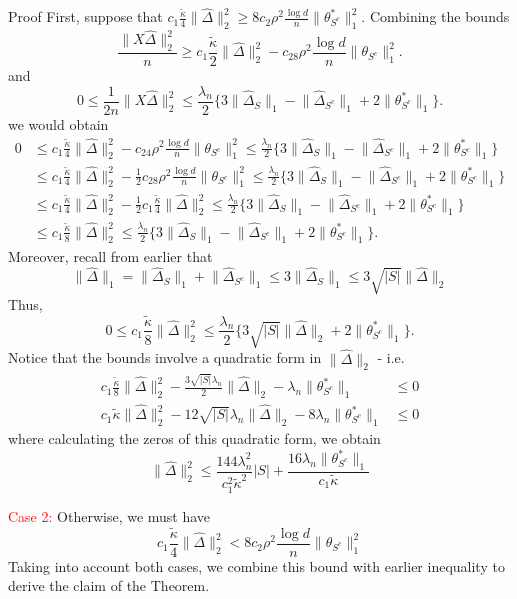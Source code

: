 \documentclass[10pt,handout,english]{beamer}
\begin{document}
\begin{frame}[allowframebreaks]{Proof}
First, suppose that $c_1\frac{\tilde{\kappa}}{4}\lVert\hat{\Delta}\rVert_2^2\geq 8c_2\rho^2\frac{\log d}{n}\lVert\theta_{S^c}^*\rVert_1^2$. Combining the bounds
\[
\frac{\lVert X\hat{\Delta}\rVert_2^2}{n}\geq c_1\frac{\tilde{\kappa}}{2}\lVert\hat{\Delta}\rVert_2^2-c_28\rho^2\frac{\log d}{n}\lVert\theta_{S^c}\rVert_1^2.
\]
and
\[
0\leq\frac{1}{2n}\lVert X\hat{\Delta}\rVert_2^2\leq \frac{\lambda_n}{2} \{3\lVert\hat{\Delta}_S\rVert_1-\lVert\hat{\Delta}_{S^c}\rVert_1+2\lVert\theta_{S^c}^*\rVert_1\}.
\]
we would obtain 
\begingroup
\allowdisplaybreaks
\begin{align*}
0&\leq c_1\frac{\tilde{\kappa}}{4}\lVert\hat{\Delta}\rVert_2^2-c_24\rho^2\frac{\log d}{n}\lVert\theta_{S^c}\rVert_1^2\leq \frac{\lambda_n}{2} \{3\lVert\hat{\Delta}_S\rVert_1-\lVert\hat{\Delta}_{S^c}\rVert_1+2\lVert\theta_{S^c}^*\rVert_1\}\\
&\leq c_1\frac{\tilde{\kappa}}{4}\lVert\hat{\Delta}\rVert_2^2-\frac{1}{2}c_28\rho^2\frac{\log d}{n}\lVert\theta_{S^c}\rVert_1^2\leq \frac{\lambda_n}{2} \{3\lVert\hat{\Delta}_S\rVert_1-\lVert\hat{\Delta}_{S^c}\rVert_1+2\lVert\theta_{S^c}^*\rVert_1\}\\
&\leq c_1\frac{\tilde{\kappa}}{4}\lVert\hat{\Delta}\rVert_2^2-\frac{1}{2}c_1\frac{\tilde{\kappa}}{4}\lVert\hat{\Delta}\rVert_2^2\leq \frac{\lambda_n}{2} \{3\lVert\hat{\Delta}_S\rVert_1-\lVert\hat{\Delta}_{S^c}\rVert_1+2\lVert\theta_{S^c}^*\rVert_1\}\\
&\leq c_1\frac{\tilde{\kappa}}{8}\lVert\hat{\Delta}\rVert_2^2\leq\frac{\lambda_n}{2} \{3\lVert\hat{\Delta}_S\rVert_1-\lVert\hat{\Delta}_{S^c}\rVert_1+2\lVert\theta_{S^c}^*\rVert_1\}. 
\end{align*}
\endgroup
Moreover, recall from earlier that
\[
\lVert\hat{\Delta}\rVert_1=\lVert\hat{\Delta}_{S}\rVert_1+\lVert\hat{\Delta}_{S^c}\rVert_1\leq 3\lVert\hat{\Delta}_S\rVert_1\leq 3\sqrt{\lvert S\rvert}\lVert \hat{\Delta}\rVert_2
\]
Thus, 
\[
0\leq c_1\frac{\tilde{\kappa}}{8}\lVert\hat{\Delta}\rVert_2^2\leq\frac{\lambda_n}{2} \{3\sqrt{\lvert S\rvert}\lVert\hat{\Delta}\rVert_2+2\lVert\theta_{S^c}^*\rVert_1\}.
\]
Notice that the bounds involve a quadratic form in $\lVert\hat{\Delta}\rVert_2$ - i.e.
\begin{align*}
c_1\frac{\tilde{\kappa}}{8}\lVert\hat{\Delta}\rVert_2^2-\frac{3\sqrt{\lvert S\rvert}\lambda_n}{2}\lVert\hat{\Delta}\rVert_2-\lambda_n\lVert\theta_{S^c}^*\rVert_1&\leq0\\
c_1\tilde{\kappa}\lVert\hat{\Delta}\rVert_2^2-12\sqrt{\lvert S\rvert}\lambda_n\lVert\hat{\Delta}\rVert_2-8\lambda_n\lVert\theta_{S^c}^*\rVert_1&\leq 0
\end{align*}
where calculating the zeros of this quadratic form, we obtain
\[
\lVert\hat{\Delta}\rVert_2^2\leq \frac{144\lambda_n^2}{c_1^2\tilde{\kappa}^2}\lvert S\rvert+\frac{16\lambda_n\lVert\theta_{S^c}^*\rVert_1}{c_1\tilde{\kappa}}
\]

\noindent\textcolor{red}{Case 2:}
Otherwise, we must have 
\[
c_1\frac{\tilde{\kappa}}{4}\lVert\hat{\Delta}\rVert_2^2<8c_2\rho^2\frac{\log d}{n}\lVert \theta_{S^c}\rVert_1^2
\]
Taking into account both cases, we combine this bound with earlier inequality to derive the claim of the Theorem.
\end{frame}
\end{document}
